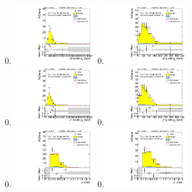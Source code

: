 \begin{figure}[htbp!]
\begin{center}
0.\includegraphics[width=0.33\textwidth, angle=270]{./figures/boosted/Control/Moriond_FourTag_Control_leadHCand_trk0_Pt.pdf}
0.\includegraphics[width=0.33\textwidth, angle=270]{./figures/boosted/Control/Moriond_FourTag_Control_leadHCand_trk1_Pt.pdf}\\
0.\includegraphics[width=0.33\textwidth, angle=270]{./figures/boosted/Control/Moriond_FourTag_Control_sublHCand_trk0_Pt.pdf}
0.\includegraphics[width=0.33\textwidth, angle=270]{./figures/boosted/Control/Moriond_FourTag_Control_sublHCand_trk1_Pt.pdf}\\
0.\includegraphics[width=0.33\textwidth, angle=270]{./figures/boosted/Control/Moriond_FourTag_Control_leadHCand_trk_dr.pdf}
0.\includegraphics[width=0.33\textwidth, angle=270]{./figures/boosted/Control/Moriond_FourTag_Control_sublHCand_trk_dr.pdf}

\end{center}
\end{figure}
